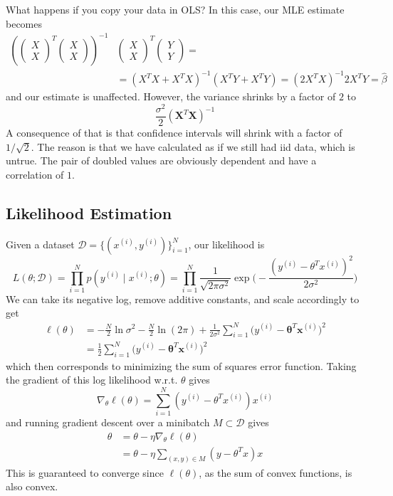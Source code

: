 \documentclass{article}
\begin{document}
    \begin{example}
    What happens if you copy your data in OLS? In this case, our MLE estimate becomes 
    \begin{align*}
        \left(\begin{pmatrix}X \\ X \end{pmatrix}^T \begin{pmatrix} X \\ X \end{pmatrix} \right )^{-1} & \begin{pmatrix} X \\ X  \end{pmatrix}^T \begin{pmatrix} Y \\ Y  \end{pmatrix}  =\\
    & = (X^T X + X^T X)^{-1} (X^T Y + X^T Y ) = (2 X^T X)^{-1} 2 X^T Y = \hat{\beta}
    \end{align*}
    and our estimate is unaffected. However, the variance shrinks by a factor of $2$ to 
    \[\frac{\sigma^2}{2} (\mathbf{X}^T \mathbf{X})^{-1}\]
    A consequence of that is that confidence intervals will shrink with a factor of $1/\sqrt{2}$. The reason is that we have calculated as if we still had iid data, which is untrue. The pair of doubled values are obviously dependent and have a correlation of $1$. 
    \end{example}

  \subsection{Likelihood Estimation}

    Given a dataset $\mathcal{D} = \{(x^{(i)}, y^{(i)})\}_{i=1}^N$, our likelihood is 
    \[L(\theta ; \mathcal{D}) = \prod_{i=1}^N p(y^{(i)} \mid x^{(i)}; \theta) = \prod_{i=1}^N \frac{1}{\sqrt{2 \pi \sigma^2}} \exp \bigg( -\frac{(y^{(i)} - \theta^T x^{(i)})^2}{2 \sigma^2} \bigg)\]
    We can take its negative log, remove additive constants, and scale accordingly to get 
    \begin{align*}
        \ell (\theta) & = -\frac{N}{2} \ln{\sigma^2} - \frac{N}{2} \ln(2 \pi) + \frac{1}{2 \sigma^2} \sum_{i=1}^N \big(y^{(i)} - \boldsymbol{\theta}^T \mathbf{x}^{(i)} \big)^2 \\
        & =\frac{1}{2} \sum_{i=1}^N \big(y^{(i)} - \boldsymbol{\theta}^T \mathbf{x}^{(i)} \big)^2 
    \end{align*}
    which then corresponds to minimizing the sum of squares error function. Taking the gradient of this log likelihood w.r.t. $\theta$ gives 
    \[\nabla_\theta \ell (\theta) = \sum_{i=1}^N ( y^{(i)} - \theta^T x^{(i)}) x^{(i)} \]
    and running gradient descent over a minibatch $M \subset \mathcal{D}$ gives 
    \begin{align*}
        \theta & = \theta - \eta \nabla_\theta \ell (\theta) \\
        & = \theta - \eta \sum_{(x, y) \in M} (y - \theta^T x) x
    \end{align*}
    This is guaranteed to converge since $\ell(\theta)$, as the sum of convex functions, is also convex. 
\end{document}
